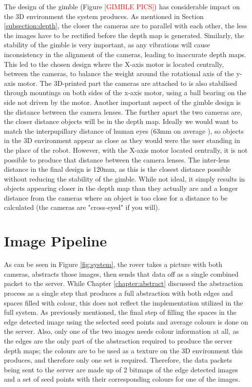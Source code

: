 The design of the gimble (Figure \textcolor{red}{[GIMBLE PICS]}) has considerable impact on the 3D environment the system produces. As mentioned in Section \ref{subsection:depth}, the closer the cameras are to parallel with each other, the less the images have to be rectified before the depth map is generated. Similarly, the stability of the gimble is very important, as any vibrations will cause inconsistency in the alignment of the cameras, leading to inaccurate depth maps. This led to the chosen design where the X-axis motor is located centrally, between the cameras, to balance the weight around the rotational axis of the y-axis motor. The 3D-printed part the cameras are attached to is also stabilised through mountings on both sides of the x-axis motor, using a ball bearing on the side not driven by the motor. Another important aspect of the gimble design is the distance between the camera lenses. The further apart the two cameras are, the closer distance objects will be in the depth map. Ideally we would want to match the interpupillary distance of human eyes (63mm on average \cite{dodgson2004variation}), so objects in the 3D environment appear as close as they would were the user standing in the place of the robot. However, with the X-axis motor located centrally, it is not possible to produce that distance between the camera lenses. The inter-lens distance in the final design is 120mm, as this is the closest distance possible without reducing the stability of the gimble. While not ideal, it simply results in objects appearing closer in the depth map than they actually are and a longer distance from the cameras where an object is too close for a distance to be calculated (the cameras are "cross-eyed" if you will).

\section{Image Pipeline}

As can be seen in Figure \ref{fig:system}, the rover takes a picture with both cameras, abstracts those images, then sends that data off as a single combined packet to the server. While Chapter \ref{chapter:abstract} discussed the abstraction process as a single step that produces a full abstraction with both edges and spaces filled with colour, this does not reflect the implementation utilized in the full system. As previously mentioned, the final step of filling the spaces in the edge detected image using the selected seed points and average colours is done on the server. Also, only one of the two images needs colour information at all, as the edges are the only part of the abstraction required to produce the server depth maps; the colours are to be used as a texture on the 3D environment this produces, and therefore only one set is required. Therefore, the data packets being sent to the server are made up of 2 bitmaps of the edge detected images and a set of seed points with their corresponding colours for one of the images.

